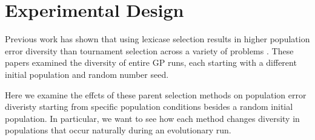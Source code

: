 \documentclass{sig-alternate-05-2015}
\begin{document}
\section{Experimental Design}

Previous work has shown that using lexicase selection results in higher population error diversity than tournament selection across a variety of problems \cite{Helmuth:2015:GPTP, Helmuth:2015:ieeeTEC}. These papers examined the diversity of entire GP runs, each starting with a different initial population and random number seed.

Here we examine the effcts of these parent selection methods on population error diveristy starting from specific population conditions besides a random initial population. In particular, we want to see how each method changes diversity in populations that occur naturally during an evolutionary run.
\end{document}
